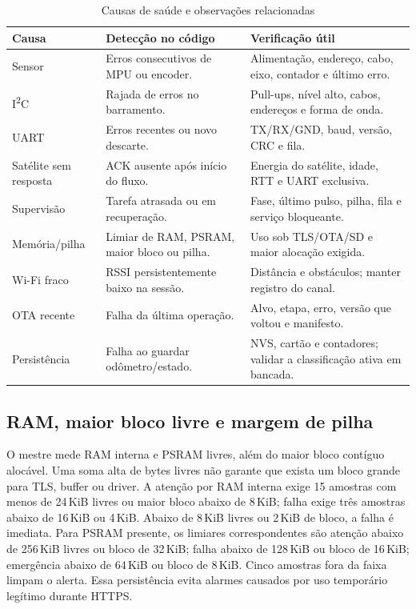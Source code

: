 \begin{table}[htbp]\centering\small
\caption{Causas de saúde e observações relacionadas}\label{tab:causas-saude}
\begin{tabularx}{\textwidth}{@{}l X X@{}}\toprule
Causa & Detecção no código & Verificação útil\\\midrule
Sensor & Erros consecutivos de MPU ou encoder. & Alimentação, endereço, cabo, eixo, contador e último erro.\\
I\textsuperscript{2}C & Rajada de erros no barramento. & Pull-ups, nível alto, cabos, endereços e forma de onda.\\
UART & Erros recentes ou novo descarte. & TX/RX/GND, baud, versão, CRC e fila.\\
Satélite sem resposta & ACK ausente após início do fluxo. & Energia do satélite, idade, RTT e UART exclusiva.\\
Supervisão & Tarefa atrasada ou em recuperação. & Fase, último pulso, pilha, fila e serviço bloqueante.\\
Memória/pilha & Limiar de RAM, PSRAM, maior bloco ou pilha. & Uso sob TLS/OTA/SD e maior alocação exigida.\\
Wi-Fi fraco & RSSI persistentemente baixo na sessão. & Distância e obstáculos; manter registro do canal.\\
OTA recente & Falha da última operação. & Alvo, etapa, erro, versão que voltou e manifesto.\\
Persistência & Falha ao guardar odômetro/estado. & NVS, cartão e contadores; validar a classificação ativa em bancada.\\\bottomrule
\end{tabularx}\end{table}

\subsection{RAM, maior bloco livre e margem de pilha}
O mestre mede RAM interna e PSRAM livres, além do maior bloco contíguo alocável. Uma soma alta de bytes livres não garante que exista um bloco grande para TLS, buffer ou driver. A atenção por RAM interna exige 15 amostras com menos de 24\,KiB livres ou maior bloco abaixo de 8\,KiB; falha exige três amostras abaixo de 16\,KiB ou 4\,KiB. Abaixo de 8\,KiB livres ou 2\,KiB de bloco, a falha é imediata. Para PSRAM presente, os limiares correspondentes são atenção abaixo de 256\,KiB livres ou bloco de 32\,KiB; falha abaixo de 128\,KiB ou bloco de 16\,KiB; emergência abaixo de 64\,KiB ou bloco de 8\,KiB. Cinco amostras fora da faixa limpam o alerta. Essa persistência evita alarmes causados por uso temporário legítimo durante HTTPS.

